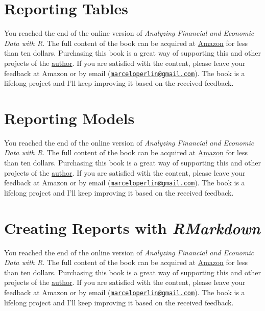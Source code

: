 \documentclass[
  12pt,
]{book}
\newenvironment{pleasebuyit}
{\begin{noteblock}
		
	} {\end{noteblock}}
\begin{document}
\hypertarget{reporting-tables}{%
\section{Reporting Tables}\label{reporting-tables}}

\begin{pleasebuyit}
You reached the end of the online version of \emph{Analyzing Financial
and Economic Data with R}. The full content of the book can be acquired
at \href{https://www.amazon.com/dp/B084LSNXMN}{Amazon} for less than ten
dollars. Purchasing this book is a great way of supporting this and
other projects of the \href{https://www.msperlin.com/blog/}{author}. If
you are satisfied with the content, please leave your feedback at Amazon
or by email
(\href{mailto:marceloperlin@gmail.com}{\nolinkurl{marceloperlin@gmail.com}}).
The book is a lifelong project and I'll keep improving it based on the
received feedback.
\end{pleasebuyit}

\hypertarget{reporting-models}{%
\section{Reporting Models}\label{reporting-models}}

\begin{pleasebuyit}
You reached the end of the online version of \emph{Analyzing Financial
and Economic Data with R}. The full content of the book can be acquired
at \href{https://www.amazon.com/dp/B084LSNXMN}{Amazon} for less than ten
dollars. Purchasing this book is a great way of supporting this and
other projects of the \href{https://www.msperlin.com/blog/}{author}. If
you are satisfied with the content, please leave your feedback at Amazon
or by email
(\href{mailto:marceloperlin@gmail.com}{\nolinkurl{marceloperlin@gmail.com}}).
The book is a lifelong project and I'll keep improving it based on the
received feedback.
\end{pleasebuyit}

\hypertarget{creating-rmarkdown}{%
\section{\texorpdfstring{Creating Reports with \emph{RMarkdown}}{Creating Reports with RMarkdown}}\label{creating-rmarkdown}}

\begin{pleasebuyit}
You reached the end of the online version of \emph{Analyzing Financial
and Economic Data with R}. The full content of the book can be acquired
at \href{https://www.amazon.com/dp/B084LSNXMN}{Amazon} for less than ten
dollars. Purchasing this book is a great way of supporting this and
other projects of the \href{https://www.msperlin.com/blog/}{author}. If
you are satisfied with the content, please leave your feedback at Amazon
or by email
(\href{mailto:marceloperlin@gmail.com}{\nolinkurl{marceloperlin@gmail.com}}).
The book is a lifelong project and I'll keep improving it based on the
received feedback.
\end{pleasebuyit}
\end{document}
